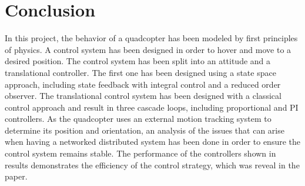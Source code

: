 \section{Conclusion}
In this project, the behavior of a quadcopter has been modeled by first principles of physics. A control system has been designed in order to hover and move to a desired position.
The control system has been split into an attitude and a translational controller. The first one has been designed using a state space approach, including state feedback with integral control and a reduced order observer. The translational control system has been designed with a classical control approach and result in three cascade loops, including proportional and PI controllers. 
As the quadcopter uses an external motion tracking system to determine its position and orientation, an analysis of the issues that can arise when having a networked distributed system has been done in order to ensure the control system remains stable. The performance of the controllers shown in results demonstrates the efficiency of the control strategy, which was reveal in the paper.

